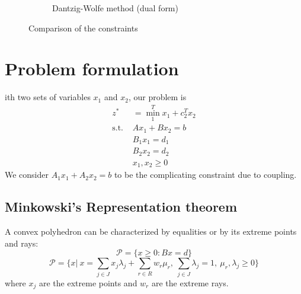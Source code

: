 \documentclass[12pt, openany]{report}
\theoremstyle{definition}
\begin{document}
\begin{figure}[H]
\begin{subfigure}[b]{.5\textwidth}
		\caption{Dantzig-Wolfe method (dual form)}
	\end{subfigure}
	\caption{Comparison of the constraints}
	\label{fig:dw}
\end{figure}
\section{Problem formulation}
ith two sets of variables $x_1$ and $x_2$, our problem is 
\begin{equation}
	\begin{aligned}
		z^* &= \min_1^Tx_1 + c_2^Tx_2\\
		\text{s.t. } &Ax_1 + Bx_2 = b\\
		&B_1x_1 = d_1\\
		&B_2x_2 = d_2\\
		&x_1,x_2\ge 0
	\end{aligned}
\end{equation}
We consider $A_1x_1+A_2x_2=b$ to be the complicating constraint due to coupling. 
\subsection{Minkowski's Representation theorem}
A convex polyhedron can be characterized by equalities or by its extreme points and rays:
\begin{equation}
	\mathcal{P} = \{x\ge 0:Bx=d\} 
\end{equation}
\begin{equation}
	\mathcal{P} = \{x|\ x = \sum_{j\in J}x_j\lambda_j + \sum_{r\in R}w_r\mu_r, \ \sum_{j\in J} \lambda_j = 1, \ \mu_r,\lambda_j\ge 0\}
\end{equation}
where $x_j$ are the extreme points and $w_r$ are the extreme rays.\\
\end{document}
